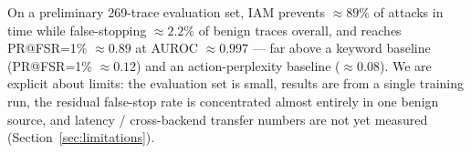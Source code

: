 On a preliminary 269-trace evaluation set, IAM prevents
$\approx 89\%$ of attacks in time while false-stopping $\approx 2.2\%$ of
benign traces overall, and reaches PR@FSR=1\% $\approx 0.89$ at AUROC
$\approx 0.997$ --- far above a keyword baseline (PR@FSR=1\% $\approx 0.12$)
and an action-perplexity baseline ($\approx 0.08$). We are explicit about
limits: the evaluation set is small, results are from a single training run,
the residual false-stop rate is concentrated almost entirely in one benign
source, and latency / cross-backend transfer numbers are not yet measured
(Section~\ref{sec:limitations}).
